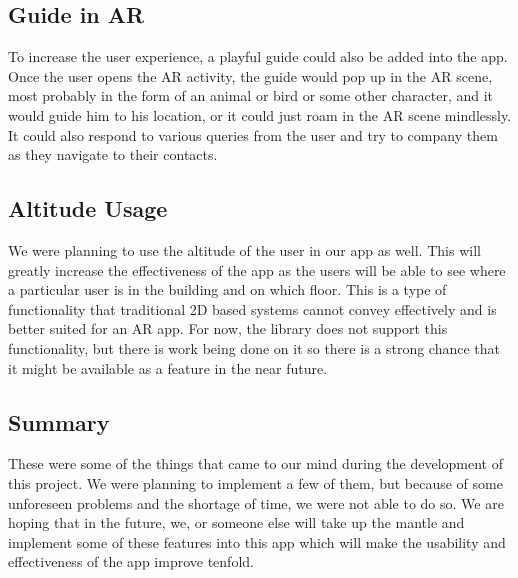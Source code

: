 \subsection{Guide in AR}
To increase the user experience, a playful guide could also be added into the app. Once the user opens the AR activity, the guide would pop up in the AR scene, most probably in the form of an animal or bird or some other character, and it would guide him to his location, or it could just roam in the AR scene mindlessly. It could also respond to various queries from the user and try to company them as they navigate to their contacts.


\subsection{Altitude Usage}
We were planning to use the altitude of the user in our app as well. This will greatly increase the effectiveness of the app as the users will be able to see where a particular user is in the building and on which floor. This is a type of functionality that traditional 2D based systems cannot convey effectively and is better suited for an AR app. For now, the library does not support this functionality, but there is work being done on it so there is a strong chance that it might be available as a feature in the near future.


\subsection{Summary}
These were some of the things that came to our mind during the development of this project. We were planning to implement a few of them, but because of some unforeseen problems and the shortage of time, we were not able to do so. We are hoping that in the future, we, or someone else will take up the mantle and implement some of these features into this app which will make the usability and effectiveness of the app improve tenfold.

